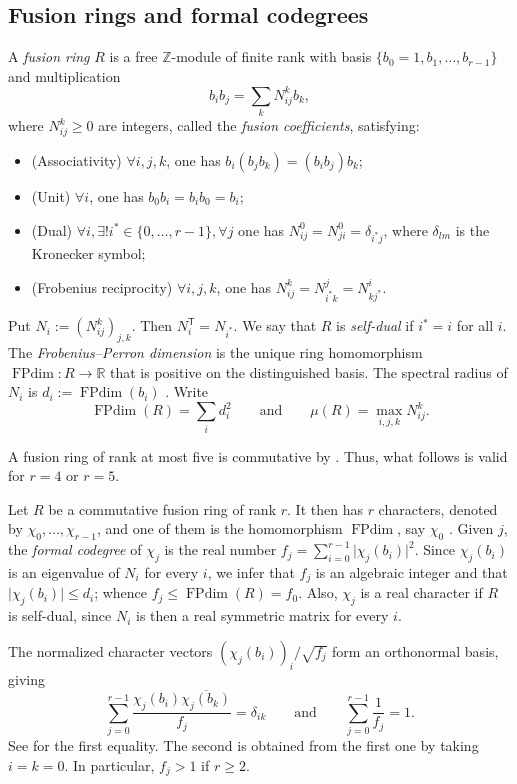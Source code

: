 \documentclass[11pt]{amsart}
\theoremstyle{definition}
\DeclareMathOperator{\FPdim}{FPdim}
\newcommand{\Z}{\mathbb Z}
\numberwithin{equation}{section}
\begin{document}
\subsection{Fusion rings and formal codegrees}
A \textit{fusion ring} $R$ is a free $\Z$-module of finite rank with basis $\{b_0=1, b_1,\dots, b_{r-1}\}$ and multiplication \[
 b_ib_j=\sum_kN_{ij}^kb_k,\] where $N_{ij}^k\geq 0$ are integers, called the \textit{fusion coefficients}, satisfying:  
\begin{itemize}
\item (Associativity) $\forall i,j,k$, one has $b_i(b_jb_k)=(b_ib_j)b_k$; 
\item (Unit) $\forall i$, one has $b_0 b_i=b_ib_0=b_i$; 
\item (Dual) $\forall i, \exists! i^*\in\{0,\dots,r-1\}, \forall j$ one has $N^{0}_{ij}=N^0_{ji}=\delta_{i^*j}$, where $\delta_{lm}$ is the Kronecker symbol; 
\item (Frobenius reciprocity) $\forall i,j,k$, one has $N^k_{ij}=N^j_{i^*k}=N^i_{kj^*}$. 
\end{itemize}
Put $N_i:=(N_{ij}^k)_{j,k}$. Then $N_i^{\mathsf T}=N_{i^*}$. 
We say that $R$ is \textit{self-dual} if $i^*=i$ for all $i$. 
The \textit{Frobenius--Perron dimension} is the unique ring homomorphism $\FPdim:R\to\mathbb R$ that is positive on the distinguished basis. 
The spectral radius of $N_i$ is $d_i:=\FPdim(b_i)$ \cite[Theorem~8.2 and Lemma~8.3]{ENO}.
Write
\[
 \FPdim(R)=\sum_i d_i^2 \qquad \text{and} \qquad \mu(R)=\max_{i,j,k}N_{ij}^k.
\]

A fusion ring of rank at most five is commutative by \cite[Proposition~9.2]{IntegralRings}. 
Thus, what follows is valid for $r=4$ or $r=5$. 

Let $R$ be a commutative fusion ring of rank $r$.
It then has $r$ characters, denoted by $\chi_0,\dots, \chi_{r-1}$, and one of them is the homomorphism $\FPdim$, say $\chi_0$ \cite[Proposition 3.3.6 (3)]{EGNO}.
Given $j$, the \textit{formal codegree} of $\chi_j$ is the real number $f_j=\sum_{i=0}^{r-1} \vert \chi_j(b_i)\vert^2$. 
Since $\chi_j(b_i)$ is an eigenvalue of $N_i$ for every $i$, we infer that $f_j$ is an algebraic integer and that $\vert \chi_j(b_i)\vert \leq d_i$; whence $f_j \leq \FPdim(R)= f_0$. 
Also, $\chi_j$ is a real character if $R$ is self-dual, since $N_i$ is then a real symmetric matrix for every $i$. 

The normalized character vectors
$(\chi_j(b_i))_i/\sqrt{f_j}$ form an orthonormal basis, giving
\begin{equation}\label{eq:orthogonality}
 \sum_{j=0}^{r-1}\frac{\chi_j(b_i)\overline{\chi_j(b_k)}}{f_j}
 =\delta_{ik} \qquad  \text{and} \qquad \sum_{j=0}^{r-1} \frac{1}{f_j}=1.
\end{equation}
See \cite[Theorem 2.4]{LPR2} for the first equality. 
The second is obtained from the first one by taking $i=k=0$. In particular, $f_j>1$ if $r\geq2$. 
\end{document}

